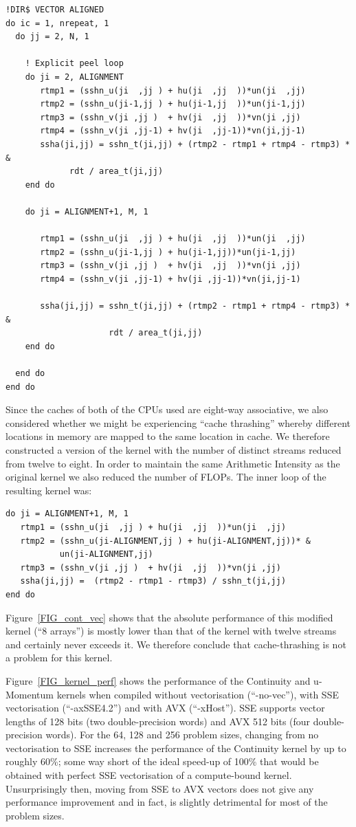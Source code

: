 \documentclass[12pt]{article}
\begin{document}
\begin{verbatim}
!DIR$ VECTOR ALIGNED
do ic = 1, nrepeat, 1
  do jj = 2, N, 1

    ! Explicit peel loop
    do ji = 2, ALIGNMENT
       rtmp1 = (sshn_u(ji  ,jj ) + hu(ji  ,jj  ))*un(ji  ,jj)
       rtmp2 = (sshn_u(ji-1,jj ) + hu(ji-1,jj  ))*un(ji-1,jj)
       rtmp3 = (sshn_v(ji ,jj )  + hv(ji  ,jj  ))*vn(ji ,jj)
       rtmp4 = (sshn_v(ji ,jj-1) + hv(ji  ,jj-1))*vn(ji,jj-1)
       ssha(ji,jj) = sshn_t(ji,jj) + (rtmp2 - rtmp1 + rtmp4 - rtmp3) * &
             rdt / area_t(ji,jj)
    end do
    
    do ji = ALIGNMENT+1, M, 1

       rtmp1 = (sshn_u(ji  ,jj ) + hu(ji  ,jj  ))*un(ji  ,jj)
       rtmp2 = (sshn_u(ji-1,jj ) + hu(ji-1,jj))*un(ji-1,jj)
       rtmp3 = (sshn_v(ji ,jj )  + hv(ji  ,jj  ))*vn(ji ,jj)
       rtmp4 = (sshn_v(ji ,jj-1) + hv(ji ,jj-1))*vn(ji,jj-1)

       ssha(ji,jj) = sshn_t(ji,jj) + (rtmp2 - rtmp1 + rtmp4 - rtmp3) * &
                     rdt / area_t(ji,jj)
    end do
    
  end do
end do
\end{verbatim}

Since the caches of both of the CPUs used are eight-way associative,
we also considered whether we might be experiencing ``cache
thrashing'' whereby different locations in memory are mapped to the
same location in cache. We therefore constructed a version of the
kernel with the number of distinct streams reduced from twelve to
eight. In order to maintain the same Arithmetic Intensity as the
original kernel we also reduced the number of FLOPs. The inner loop of
the resulting kernel was:
\begin{verbatim}
do ji = ALIGNMENT+1, M, 1
   rtmp1 = (sshn_u(ji  ,jj ) + hu(ji  ,jj  ))*un(ji  ,jj)
   rtmp2 = (sshn_u(ji-ALIGNMENT,jj ) + hu(ji-ALIGNMENT,jj))* &
           un(ji-ALIGNMENT,jj)
   rtmp3 = (sshn_v(ji ,jj )  + hv(ji  ,jj  ))*vn(ji ,jj)
   ssha(ji,jj) =  (rtmp2 - rtmp1 - rtmp3) / sshn_t(ji,jj)
end do
\end{verbatim}

Figure~\ref{FIG_cont_vec} shows that the absolute performance of this
modified kernel (``8 arrays'') is mostly lower than that of the kernel
with twelve streams and certainly never exceeds it. We therefore
conclude that cache-thrashing is not a problem for this kernel.

Figure~\ref{FIG_kernel_perf} shows the performance of the Continuity
and u-Momentum kernels when compiled without vectorisation
(``-no-vec''), with SSE vectorisation (``-axSSE4.2'') and with AVX
(``-xHost''). SSE supports vector lengths of 128 bits (two
double-precision words) and AVX 512 bits (four double-precision
words). For the 64, 128 and 256 problem sizes, changing from no
vectorisation to SSE increases the performance of the Continuity
kernel by up to roughly 60\%; some way short of the ideal speed-up of
100\% that would be obtained with perfect SSE vectorisation of a
compute-bound kernel. Unsurprisingly then, moving from SSE to AVX
vectors does not give any performance improvement and in fact, is
slightly detrimental for most of the problem sizes.
\end{document}

